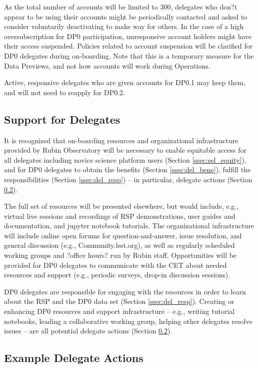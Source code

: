 \documentclass[DM,authoryear,toc]{lsstdoc}
\begin{document}
As the total number of accounts will be limited to 300, delegates who don?t appear to be using their accounts might be periodically contacted and asked to consider voluntarily deactivating to make way for others.
In the case of a high oversubscription for DP0 participation, unresponsive account holders might have their access suspended.
Policies related to account suspension will be clarified for DP0 delegates during on-boarding.
Note that this is a temporary measure for the Data Previews, and not how accounts will work during Operations.

Active, responsive delegates who are given accounts for DP0.1 may keep them, and will not need to reapply for DP0.2.

\subsection{Support for Delegates}\label{ssec:res_sup}

It is recognized that on-boarding resources and organizational infrastructure provided by Rubin Observatory will be necessary to enable equitable access for all delegates including novice science platform users (Section \ref{ssec:sel_equity}), and for DP0 delegates to obtain the benefits (Section \ref{ssec:del_bene}), fulfill the responsibilities (Section \ref{ssec:del_resp}) -- in particular, delegate actions (Section \ref{ssec:res_act}). 

The full set of resources will be presented elsewhere, but would include, e.g., virtual live sessions and recordings of RSP demonstrations, user guides and documentation, and jupyter notebook tutorials.
The organizational infrastructure will include online open forums for question-and-answer, issue resolution, and general discussion (e.g., Community.lsst.org), as well as regularly scheduled working groups and ?office hours? run by Rubin staff.
Opportunities will be provided for DP0 delegates to communicate with the CET about needed resources and support (e.g., periodic surveys, drop-in discussion sessions).

DP0 delegates are responsible for engaging with the resources in order to learn about the RSP and the DP0 data set (Section \ref{ssec:del_resp}).
Creating or enhancing DP0 resources and support infrastructure -- e.g., writing tutorial notebooks, leading a collaborative working group, helping other delegates resolve issues -- are all potential delegate actions (Section \ref{ssec:res_act}).

\subsection{Example Delegate Actions}\label{ssec:res_act}
\end{document}
